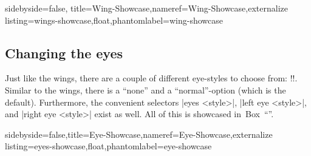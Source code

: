 \documentclass[parskip=half,english,numbers=noenddot,footnotes=nomultiple,oneside,fontsize=10pt,DIV=15,headinclude]{scrartcl}
\makeatletter
\let\say\enquote
\def\DTLlistformatitem#1{\textit{#1\expandafter\ParseDTLListElement :#1\@nil}}
\newcommand*\typesetselection[1][]{\begingroup\ifx!#1!\else\def\DTLlistformatitem##1{#1}\fi\dotypesetselection}
\def\dotypesetselection#1{\label{expl-list:#1}\def\CurrentList{#1}\expandafter\DTLformatlist\expandafter{\csname @pingu@#1@\endcsname}\endgroup}
\makeatother
\begin{document}
\begin{tcblisting}{sidebyside=false, title=Wing-Showcase,nameref=Wing-Showcase,externalize listing=wings-showcase,float,phantomlabel=wing-showcase}
\begin{tikzpicture}
	\pingu[left wing none, heart=green]
	\pingu[wings wave, heart=teal, xshift=3.5cm]
	\pingu[wings hug, heart=orange, xshift=7cm]
	\pingu[left wing grab, right wing shock, heart=purple, xshift=10.5cm]
\end{tikzpicture}
\end{tcblisting}

\subsection{Changing the eyes}
\label{mrk:pengu-eye}Just like the wings, there are a couple of different eye-styles to choose from: \typesetselection{lefteye}.
Similar to the wings, there is a \say{none} and a \say{normal}-option (which is the default).
Furthermore, the convenient selectors |eyes <style>|, |left eye <style>|, and |right eye <style>| exist as well. All of this is showcased in~Box~\say{}.

\begin{tcblisting}{sidebyside=false,title=Eye-Showcase,nameref=Eye-Showcase,externalize listing=eyes-showcase,float,phantomlabel=eye-showcase}
\begin{tikzpicture}
	\pingu[left eye none, heart=green]
	\pingu[eyes wink, heart=teal, xshift=3.5cm]
	\pingu[eyes shock, heart=orange, xshift=7cm]
	\pingu[left eye devil, right eye angry, heart=purple,  xshift=10.5cm]
\end{tikzpicture}
\end{tcblisting}
\end{document}
